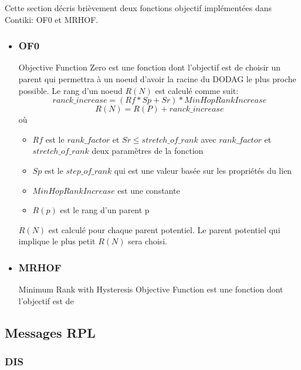 Cette section décris brièvement deux fonctions objectif implémentées dans Contiki: OF0 et MRHOF.
\begin{itemize}
    \item \subsubsection*{OF0}%
            Objective Function Zero est une fonction dont l'objectif est de choisir un parent qui permettra à un noeud d'avoir la racine du DODAG le plus proche possible. Le rang d'un noeud $R(N)$ est calculé comme suit:
                \[ranck\_increase = (Rf * Sp + Sr) * MinHopRankIncrease\]
                \[R(N) = R(P) + ranck\_increase\]
                où
                \begin{itemize}
                    \item $Rf$ est le $rank\_factor$ et $Sr \leq stretch\_of\_rank$ avec $rank\_factor$ et $stretch\_of\_rank$ deux paramètres de la fonction
                    \item $Sp$ est le $step\_of\_rank$ qui est une valeur basée sur les propriétés du lien
                    \item $MinHopRankIncrease$ est une constante
                    \item $R(p)$ est le rang d'un parent p
                \end{itemize}
                $R(N)$ est calculé pour chaque parent potentiel. Le parent potentiel qui implique le plus petit $R(N)$ sera choisi.
                
    \item \subsubsection*{MRHOF}%
            Minimum Rank with Hysteresis Objective Function est une fonction dont l'objectif est de 
\end{itemize}




\subsection*{Messages RPL}
\subsubsection*{DIS}

